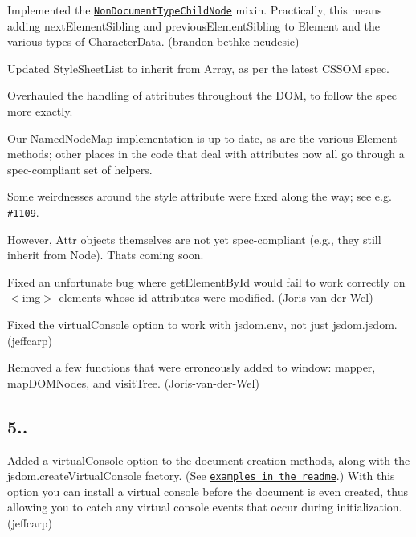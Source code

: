 \begin{DoxyItemize}
\item Implemented the \href{https://dom.spec.whatwg.org/#nondocumenttypechildnode}{\tt {\ttfamily Non\+Document\+Type\+Child\+Node}} mixin. Practically, this means adding {\ttfamily next\+Element\+Sibling} and {\ttfamily previous\+Element\+Sibling} to {\ttfamily Element} and the various types of {\ttfamily Character\+Data}. (brandon-\/bethke-\/neudesic)
\item Updated {\ttfamily Style\+Sheet\+List} to inherit from {\ttfamily Array}, as per the latest C\+S\+S\+OM spec.
\item Overhauled the handling of attributes throughout the D\+OM, to follow the spec more exactly.
\begin{DoxyItemize}
\item Our {\ttfamily Named\+Node\+Map} implementation is up to date, as are the various {\ttfamily Element} methods; other places in the code that deal with attributes now all go through a spec-\/compliant set of helpers.
\item Some weirdnesses around the {\ttfamily style} attribute were fixed along the way; see e.\+g. \href{https://github.com/tmpvar/jsdom/issues/1109}{\tt \#1109}.
\item However, {\ttfamily Attr} objects themselves are not yet spec-\/compliant (e.\+g., they still inherit from {\ttfamily Node}). That\textquotesingle{}s coming soon.
\end{DoxyItemize}
\item Fixed an unfortunate bug where {\ttfamily get\+Element\+By\+Id} would fail to work correctly on {\ttfamily $<$img$>$} elements whose {\ttfamily id} attributes were modified. (Joris-\/van-\/der-\/\+Wel)
\item Fixed the {\ttfamily virtual\+Console} option to work with {\ttfamily jsdom.\+env}, not just {\ttfamily jsdom.\+jsdom}. (jeffcarp)
\item Removed a few functions that were erroneously added to {\ttfamily window}\+: {\ttfamily mapper}, {\ttfamily map\+D\+O\+M\+Nodes}, and {\ttfamily visit\+Tree}. (Joris-\/van-\/der-\/\+Wel)
\end{DoxyItemize}

\subsection*{5..}


\begin{DoxyItemize}
\item Added a {\ttfamily virtual\+Console} option to the document creation methods, along with the {\ttfamily jsdom.\+create\+Virtual\+Console} factory. (See \href{https://github.com/tmpvar/jsdom/blob/dbf88666d1152576237ed1c741263f5516bb4005/README.md#capturing-console-output}{\tt examples in the readme}.) With this option you can install a virtual console before the document is even created, thus allowing you to catch any virtual console events that occur during initialization. (jeffcarp)
\end{DoxyItemize}

